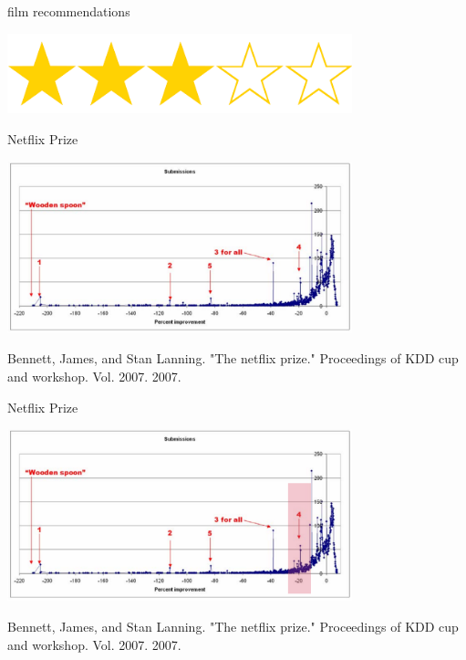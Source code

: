 \documentclass{beamer}
\begin{document}
\begin{frame}{film  recommendations}
  \begin{center}
    \includegraphics[width=10cm]{stars.png}
  \end{center}
\end{frame}


\begin{frame}{Netflix Prize}
  \begin{center}
    \includegraphics[width=10cm]{netflix_prize.png}
  \end{center}
  \vfill
\tiny{Bennett, James, and Stan Lanning. "The netflix prize." Proceedings of KDD cup and workshop. Vol. 2007. 2007.}
\end{frame}


\begin{frame}{Netflix Prize}
  \begin{center}
    \includegraphics[width=10cm]{netflix_prize_1.png}
  \end{center}
  \vfill
\tiny{Bennett, James, and Stan Lanning. "The netflix prize." Proceedings of KDD cup and workshop. Vol. 2007. 2007.}
\end{frame}
\end{document}
